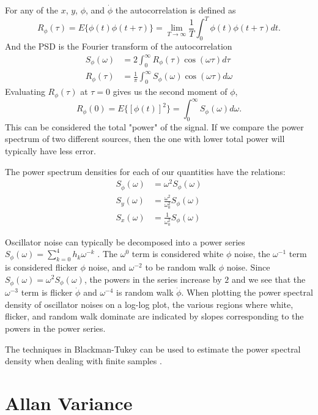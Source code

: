 For any of the $x$, $y$, $\phi$, and $\dot{\phi}$ the autocorrelation is defined as
%
\begin{equation}
R_\phi(\tau) = E\{\phi(t)\phi(t+\tau)\} = \lim\limits_{T\to\infty}\frac{1}{T}\int_{0}^{T} \phi(t)\phi(t+\tau)dt.
\end{equation}
%
And the PSD is the Fourier transform of the autocorrelation
%
\begin{align}
S_\phi(\omega) &= 2\int_0^\infty R_\phi(\tau)\cos(\omega\tau)d\tau \\
R_\phi(\tau) &= \frac{1}{\pi}\int_0^\infty S_\phi(\omega)\cos(\omega\tau)d\omega
\end{align}
%
Evaluating $R_\phi(\tau)$ at $\tau = 0$ gives us the second moment of $\phi$, 
%
\begin{equation*}
R_\phi(0) = E\{[\phi(t)]^2\} = \int_0^\infty S_\phi(\omega) d\omega .
\end{equation*}
%
This can be considered the total "power" of the signal. If we compare the power spectrum of two different sources, then the one with lower total power will typically have less error.

The power spectrum densities for each of our quantities have the relations:
%
\begin{align}
S_{\dot{\phi}}(\omega) &= \omega^2 S_\phi(\omega) \\
S_y(\omega) &= \frac{\omega^2}{\omega_0^2}S_\phi(\omega) \\
S_x(\omega) &= \frac{1}{\omega_0^2}S_\phi(\omega)
\end{align}
%

Oscillator noise can typically be decomposed into a power series $S_\phi(\omega) = \sum_{k=0}^{4} h_k\omega^{-k}$ \cite{Riley1994}. The $\omega^0$ term is considered white $\phi$ noise, the $\omega^{-1}$ term is considered flicker $\phi$ noise, and $\omega^{-2}$ to be random walk $\phi$ noise. Since $S_{\dot{\phi}}(\omega) = \omega^2 S_\phi(\omega)$, the powers in the series increase by $2$ and we see that the $\omega^{-3}$ term is flicker $\dot{\phi}$ and $\omega^{-4}$ is random walk $\dot{\phi}$. When plotting the power spectral density of oscillator noises on a log-log plot, the various regions where white, flicker, and random walk dominate are indicated by slopes corresponding to the powers in the power series.

The techniques in Blackman-Tukey can be used to estimate the power spectral density when dealing with finite samples \cite{Blackman1958}.

\section{Allan Variance} \label{sec:avar}

